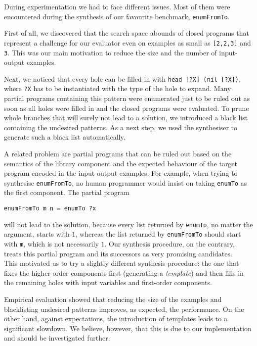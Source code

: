 During experimentation we had to face different issues. Most of them were encountered during the synthesis of our favourite benchmark, \lstinline!enumFromTo!.

First of all, we discovered that the search space abounds of closed programs that represent a challenge for our evaluator even on examples as small as \lstinline![2,2,3]! and \lstinline!3!. This was our main motivation to reduce the size and the number of input-output examples.

Next, we noticed that every hole can be filled in with \lstinline!head [?X] (nil [?X])!, where \lstinline!?X! has to be instantiated with the type of the hole to expand. Many partial programs containing this pattern were enumerated just to be ruled out as soon as all holes were filled in and the closed programs were evaluated. To prune whole branches that will surely not lead to a solution, we introduced a black list containing the undesired patterns. As a next step, we used the synthesiser to generate such a black list automatically.

A related problem are partial programs that can be ruled out based on the semantics of the library component and the expected behaviour of the target program encoded in the input-output examples. For example, when trying to synthesise \lstinline!enumFromTo!, no human programmer would insist on taking \lstinline!enumTo! as the first component. The partial program
\begin{lstlisting}[style=plain]
enumFromTo m n = enumTo ?x
\end{lstlisting}
will not lead to the solution, because every list returned by \lstinline!enumTo!, no matter the argument, starts with $1$, whereas the list returned by \lstinline!enumFromTo! should start with \lstinline!m!, which is not necessarily $1$. Our synthesis procedure, on the contrary, treats this partial program and its successors as very promising candidates.\\
This motivated us to try a slightly different synthesis procedure: the one that fixes the higher-order components first (generating a \emph{template}) and then fills in the remaining holes with input variables and first-order components.

Empirical evaluation showed that reducing the size of the examples and blacklisting undesired patterns improves, as expected, the performance. On the other hand, against expectations, the introduction of templates leads to a significant slowdown. We believe, however, that this is due to our implementation and should be investigated further.

